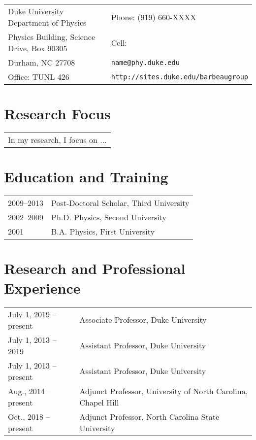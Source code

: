 \documentclass[overlapped,line,letterpaper]{res}
\begin{document}

\setlength{\leftmargini}{0em}
\renewcommand{\labelitemi}{}




\begin{resume}

\begin{tabular}{p{3in}p{3in}}
  Duke University Department of Physics       & Phone: (919) 660-XXXX \\
  Physics Building, Science Drive, Box 90305                  & Cell: \\
  Durham, NC 27708	               &  {\tt name@phy.duke.edu}\\
  Office: TUNL 426			& {\tt http://sites.duke.edu/barbeaugroup}\\
\end{tabular}
\section{\textbf{Research Focus}}
\begin{tabular}{l}
In my research, I focus on ...


\end{tabular}
\section{\bf Education and Training}
\begin{tabular}{p{1.3in}p{4.75in}}
2009--2013 & Post-Doctoral Scholar, Third University\\
2002--2009 & Ph.D. Physics, Second University\\
2001 & B.A. Physics, First University\\
\end{tabular}

\section{\bf Research and Professional Experience}
\begin{tabular}{p{1.3in}p{4.75in}}
July 1, 2019 -- present& Associate Professor, Duke University\\
July 1, 2013 -- 2019& Assistant Professor, Duke University\\
July 1, 2013 -- present& Assistant Professor, Duke University\\
Aug., 2014 -- present& Adjunct Professor, University of North Carolina, Chapel Hill\\
Oct., 2018 -- present& Adjunct Professor, North Carolina State University\\
\end{tabular}




\end{resume}
\end{document}

